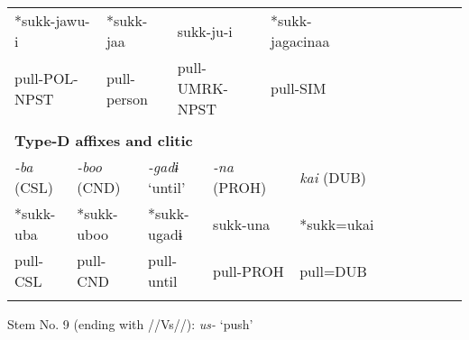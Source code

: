\begin{tabularx}{\textwidth}{XXXXXXXXXXXXXXXXXXXXXXXX}
\multicolumn{4}{X}{{ *sukk-jawu-i}} & \multicolumn{3}{X}{*sukk-jaa} & \multicolumn{5}{X}{sukk-ju-i} & \multicolumn{4}{X}{{ *sukk-jagacinaa}} & \multicolumn{8}{X}{}\\
\multicolumn{4}{X}{pull-POL-NPST} & \multicolumn{3}{X}{pull-person} & \multicolumn{5}{X}{pull-UMRK-NPST} & \multicolumn{4}{X}{pull-SIM} & \multicolumn{8}{X}{}\\
\multicolumn{24}{X}{}\\
\multicolumn{24}{X}{{\bfseries Type-D affixes and clitic}}\\
\multicolumn{2}{X}{{ \textit{{}-ba} (CSL)}} & \multicolumn{4}{X}{{ \textit{{}-boo} (CND)}} & \multicolumn{3}{X}{{ \textit{{}-gadɨ} ‘until’}} & \multicolumn{4}{X}{{ \textit{{}-na} (PROH)}} & \multicolumn{6}{X}{{ \textit{kai} (DUB)}} & \multicolumn{5}{X}{}\\
\multicolumn{2}{X}{{ *sukk-uba}} & \multicolumn{4}{X}{{ *sukk-uboo}} & \multicolumn{3}{X}{{ *sukk-ugadɨ}} & \multicolumn{4}{X}{{ sukk-una}} & \multicolumn{6}{X}{{ *sukk=ukai}} & \multicolumn{5}{X}{}\\
\multicolumn{2}{X}{pull-CSL} & \multicolumn{4}{X}{pull-CND} & \multicolumn{3}{X}{pull-until} & \multicolumn{4}{X}{pull-PROH} & \multicolumn{6}{X}{pull=DUB} & \multicolumn{5}{X}{}\\
\lspbottomrule
\end{tabularx}
Stem No. 9 (ending with //Vs//): \textit{us-} ‘push’

\tablefirsthead{}


